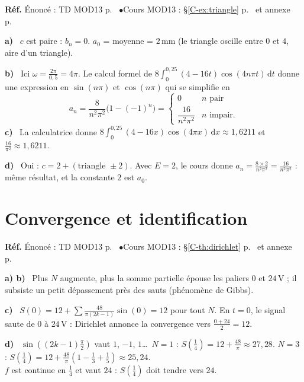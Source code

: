 \documentclass[a4paper,11pt]{article}
\newcommand{\cours}[1]{§\ref{C-#1} p.~\pageref{C-#1}}
\newcommand{\source}[2]{{\footnotesize\color{uimmgray}\textbf{Réf.} \enspace Énoncé : TD MOD13 p.~\pageref{T-#1} \enspace$\bullet$\enspace Cours MOD13 : #2}\par\smallskip}
\newcommand{\annexe}[1]{annexe p.~\pageref{C-#1}}
\newcommand{\q}[1]{\textbf{\color{uimmblue}#1}\ }
\begin{document}
\begin{correction}
\source{exo:10}{\cours{ex:triangle} et \annexe{fiche:geogebra}}
\q{a)} $c$ est paire : $b_n = 0$. $a_0$ = moyenne = $2$\,mm (le triangle oscille entre $0$ et $4$, aire d'un triangle).

\q{b)} Ici $\omega = \frac{2\pi}{0{,}5} = 4\pi$. Le calcul formel de $8\int_0^{0{,}25}(4-16t)\cos(4n\pi t)\,\mathrm dt$ donne une expression en $\sin(n\pi)$ et $\cos(n\pi)$ qui se simplifie en
\[
a_n = \frac{8}{n^2\pi^2}\big(1 - (-1)^n\big) = \begin{cases} 0 & n \text{ pair}\\[2pt] \dfrac{16}{n^2\pi^2} & n \text{ impair.}\end{cases}
\]
\q{c)} La calculatrice donne $8\int_0^{0{,}25}(4-16x)\cos(4\pi x)\,\mathrm dx\approx 1{,}6211$ et $\frac{16}{\pi^2}\approx 1{,}6211$.

\q{d)} Oui : $c = 2 + (\text{triangle } \pm 2)$. Avec $E = 2$, le cours donne $a_n = \frac{8\times 2}{n^2\pi^2} = \frac{16}{n^2\pi^2}$ : même résultat, et la constante $2$ est $a_0$.
\end{correction}

\needspace{8cm}
\section{Convergence et identification}

\begin{correction}
\source{exo:11}{\cours{th:dirichlet} et \annexe{fiche:geogebra}}
\q{a) b)} Plus $N$ augmente, plus la somme partielle épouse les paliers $0$ et $24$\,V ; il subsiste un petit dépassement près des sauts (phénomène de Gibbs).

\q{c)} $S(0) = 12 + \sum\frac{48}{\pi(2k-1)}\sin(0) = 12$ pour tout $N$. En $t = 0$, le signal saute de $0$ à $24$\,V : Dirichlet annonce la convergence vers $\frac{0 + 24}{2} = 12$.

\q{d)} $\sin\left((2k-1)\frac{\pi}{2}\right)$ vaut $1$, $-1$, $1$\dots\ \quad $N = 1$ : $S\left(\frac14\right) = 12 + \frac{48}{\pi}\approx 27{,}28$. \quad $N = 3$ : $S\left(\frac14\right) = 12 + \frac{48}{\pi}\left(1 - \frac13 + \frac15\right)\approx 25{,}24$.\\
$f$ est continue en $\frac14$ et vaut $24$ : $S\left(\frac14\right)$ doit tendre vers $24$.
\end{correction}
\end{document}

